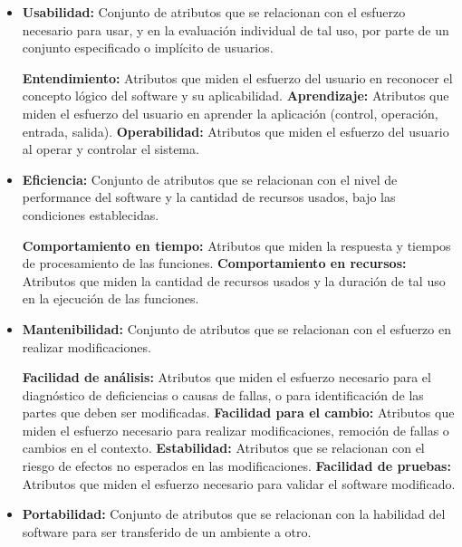 \begin{center}
\begin{itemize}
        \item \textbf{Usabilidad:} Conjunto de atributos que se
        relacionan con el esfuerzo necesario para usar, y
        en la evaluación individual de tal uso, por parte
        de un conjunto especificado o implícito de
        usuarios.

        \subitem \textbf{Entendimiento: } Atributos que miden el esfuerzo del
            usuario en reconocer el concepto lógico del
            software y su aplicabilidad.
        \subitem \textbf{ Aprendizaje: } Atributos que miden el esfuerzo del
            usuario en aprender la aplicación (control,
            operación, entrada, salida).
        \subitem \textbf{Operabilidad: } Atributos que miden el esfuerzo del
            usuario al operar y controlar el sistema.

        \item \textbf{Eficiencia:} Conjunto de atributos que se
        relacionan con el nivel de performance del
        software y la cantidad de recursos usados, bajo
        las condiciones establecidas.

        \subitem \textbf{Comportamiento en tiempo: } Atributos que miden la
            respuesta y tiempos de procesamiento de las
            funciones.
        \subitem \textbf{Comportamiento en recursos: } Atributos que miden
            la cantidad de recursos usados y la duración de tal
            uso en la ejecución de las funciones.

        \item \textbf{Mantenibilidad:} Conjunto de atributos que se
        relacionan con el esfuerzo en realizar modificaciones.

        \subitem \textbf{Facilidad de análisis: } Atributos que miden el esfuerzo
            necesario para el diagnóstico de deficiencias o causas
            de fallas, o para identificación de las partes que deben
            ser modificadas.
        \subitem \textbf{Facilidad para el cambio: } Atributos que miden el
            esfuerzo necesario para realizar modificaciones,
            remoción de fallas o cambios en el contexto.
        \subitem \textbf{Estabilidad: }Atributos que se relacionan con el riesgo de
            efectos no esperados en las modificaciones.
        \subitem \textbf{Facilidad de pruebas: } Atributos que miden el esfuerzo
            necesario para validar el software modificado.

        \item \textbf{Portabilidad:} Conjunto de atributos que se relacionan
        con la habilidad del software para ser transferido de un
        ambiente a otro.


\end{itemize}
\end{center}
